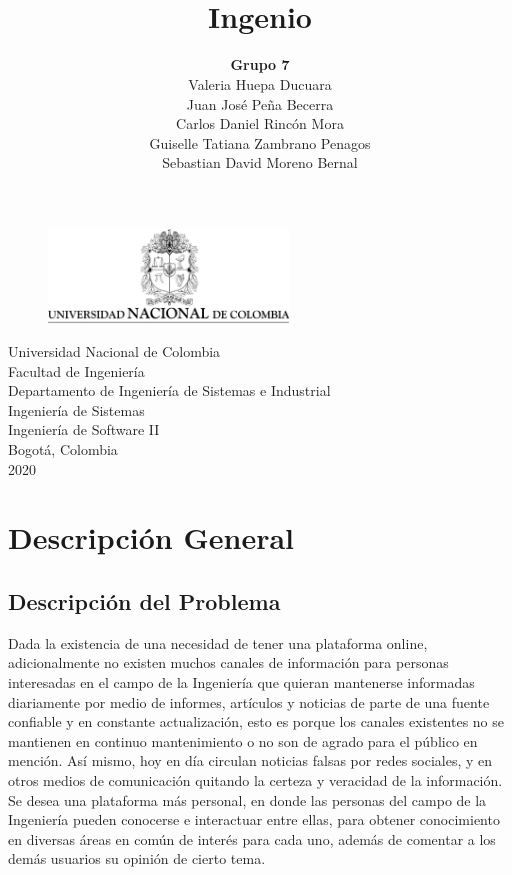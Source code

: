 \documentclass[a4paper,12 pt]{article}
\title{\LARGE \textbf{\\[0.5cm] Ingenio\\[2.5cm]}}
\author{\textbf{Grupo 7}\\[0.5cm]
        Valeria Huepa Ducuara\\
        Juan José Peña Becerra\\
        Carlos Daniel Rincón Mora\\
        Guiselle Tatiana Zambrano Penagos\\[2.5cm]
        Sebastian David Moreno Bernal\\[2.5cm]}
\date{}
\begin{document}
\newpage

\begin{figure}
    \centering
    \includegraphics[width=0.57\textwidth]{images/escudoUN.png}
\end{figure}
\maketitle 
\thispagestyle{empty}

\begin{center}
    \small Universidad Nacional de Colombia\\
    Facultad de Ingeniería\\
    Departamento de Ingeniería de Sistemas e Industrial\\
    Ingeniería de Sistemas\\
    Ingeniería de Software II\\
    Bogotá, Colombia\\
    2020
\end{center}
\newpage
\tableofcontents %
\thispagestyle{empty}

\newpage
\setcounter{page}{1}
\pagestyle{plain}

\section{Descripción General}


\subsection{Descripción del Problema}

Dada la existencia de una necesidad de tener una plataforma online, adicionalmente no
existen muchos canales de información para personas interesadas en el campo de la
Ingeniería que quieran mantenerse informadas diariamente por medio de informes,
artículos y noticias de parte de una fuente confiable y en constante actualización,
esto es porque los canales existentes no se mantienen en continuo mantenimiento o no
son de agrado para el público en mención. Así mismo, hoy en día circulan noticias
falsas por redes sociales, y en otros medios de comunicación quitando la certeza y
veracidad de la información. Se desea una plataforma más personal, en donde las
personas del campo de la Ingeniería pueden conocerse e interactuar entre ellas, para
obtener conocimiento en diversas áreas en común de interés para cada uno, además de
comentar a los demás usuarios su opinión de cierto tema.\\
\end{document}
